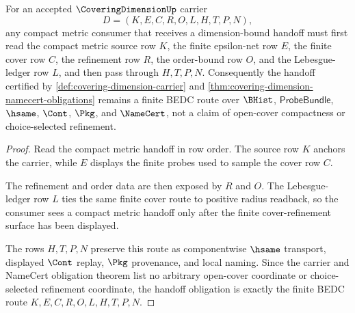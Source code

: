 \begin{theorem}
\label{thm:coveringdimension-compactmetric-handoff-obligation}
For an accepted $\CoveringDimensionUp$ carrier
$$
D=(K,E,C,R,O,L,H,T,P,N),
$$
any compact metric consumer that receives a dimension-bound handoff must first read the compact metric source row $K$, the finite epsilon-net row $E$, the finite cover row $C$, the refinement row $R$, the order-bound row $O$, and the Lebesgue-ledger row $L$, and then pass through $H,T,P,N$. Consequently the handoff certified by \autoref{def:covering-dimension-carrier} and \autoref{thm:covering-dimension-namecert-obligations} remains a finite BEDC route over $\BHist$, $\mathsf{ProbeBundle}$, $\hsame$, $\Cont$, $\Pkg$, and $\NameCert$, not a claim of open-cover compactness or choice-selected refinement.
\end{theorem}
\begin{proof}
Read the compact metric handoff in row order. The source row $K$ anchors the carrier, while $E$ displays the finite probes used to sample the cover row $C$.

The refinement and order data are then exposed by $R$ and $O$. The Lebesgue-ledger row $L$ ties the same finite cover route to positive radius readback, so the consumer sees a compact metric handoff only after the finite cover-refinement surface has been displayed.

The rows $H,T,P,N$ preserve this route as componentwise $\hsame$ transport, displayed $\Cont$ replay, $\Pkg$ provenance, and local naming. Since the carrier and NameCert obligation theorem list no arbitrary open-cover coordinate or choice-selected refinement coordinate, the handoff obligation is exactly the finite BEDC route $K,E,C,R,O,L,H,T,P,N$.
\end{proof}

